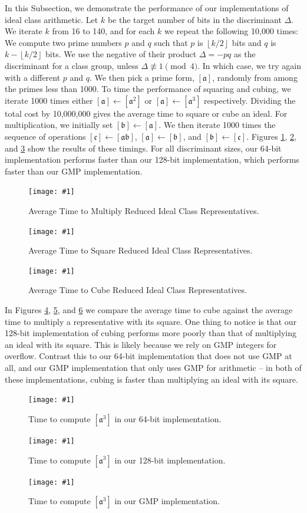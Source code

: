 \documentclass{ucalgthes1}
\theoremstyle{definition}
\newcommand{\floor}[1]{\left\lfloor #1 \right\rfloor}
\newcommand{\mygraph}[3]{
	\begin{figure}[H]
	\centering
	\texttt{[image: \#1]}
	\caption{#3}
	\label{#2}
	\end{figure}
}
\begin{document}
In this Subsection, we demonstrate the performance of our implementations of ideal class arithmetic. Let $k$ be the target number of bits in the discriminant $\Delta$.  We iterate $k$ from 16 to 140, and for each $k$ we repeat the following 10,000 times: We compute two prime numbers $p$ and $q$ such that $p$ is $\floor{k/2}$ bits and $q$ is $k-\floor{k/2}$ bits.  We use the negative of their product $\Delta = -pq$ as the discriminant for a class group, unless $\Delta \not\equiv 1 \pmod 4$. In which case, we try again with a different $p$ and $q$.  We then pick a prime form, $[\mathfrak a]$, randomly from among the primes less than 1000.  To time the performance of squaring and cubing, we iterate 1000 times either $[\mathfrak a] \gets [\mathfrak a^2]$ or $[\mathfrak a] \gets [\mathfrak a^3]$ respectively.  Dividing the total cost by 10,000,000 gives the average time to square or cube an ideal.  For multiplication, we initially set $[\mathfrak b] \gets [\mathfrak a]$.  We then iterate 1000 times the sequence of operations $[\mathfrak c] \gets [\mathfrak a\mathfrak b]$, $[\mathfrak a] \gets [\mathfrak b]$, and $[\mathfrak b] \gets [\mathfrak c]$. Figures \ref{fig:idealCompose}, \ref{fig:idealSquare}, and \ref{fig:idealCube} show the results of these timings. For all discriminant sizes, our 64-bit implementation performs faster than our 128-bit implementation, which performs faster than our GMP implementation.

\mygraph{compose-all}{fig:idealCompose}{Average Time to Multiply Reduced Ideal Class Representatives.}
\mygraph{square-all}{fig:idealSquare}{Average Time to Square Reduced Ideal Class Representatives.}
\mygraph{cube-all}{fig:idealCube}{Average Time to Cube Reduced Ideal Class Representatives.}

In Figures \ref{fig:cubingVs64}, \ref{fig:cubingVs128}, and \ref{fig:cubingVsMpz} we compare the average time to cube against the average time to multiply a representative with its square.  One thing to notice is that our 128-bit implementation of cubing performs more poorly than that of multiplying an ideal with its square.  This is likely because we rely on GMP integers for overflow.  Contrast this to our 64-bit implementation that does not use GMP at all, and our GMP implementation that only uses GMP for arithmetic -- in both of these implementations, cubing is faster than multiplying an ideal with its square.
\mygraph{cube-vs-64}{fig:cubingVs64}{Time to compute $[\mathfrak a^3]$ in our 64-bit implementation.}
\mygraph{cube-vs-128}{fig:cubingVs128}{Time to compute $[\mathfrak a^3]$ in our 128-bit implementation.}
\mygraph{cube-vs-mpz}{fig:cubingVsMpz}{Time to compute $[\mathfrak a^3]$ in our GMP implementation.}
\end{document}
